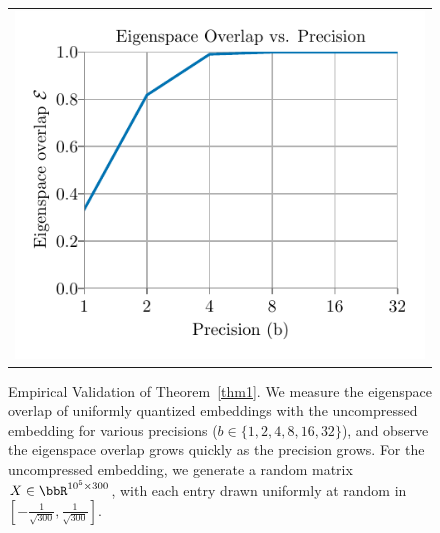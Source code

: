 
\begin{figure}
	\begin{tabular}{c}
		\includegraphics[width=\linewidth]{figures/micro_eig_overlap_vs_precision.pdf} 
\end{tabular}
\caption{Empirical Validation of Theorem~\ref{thm1}. We measure the eigenspace overlap of uniformly quantized embeddings with the uncompressed embedding for various precisions ($b\in\{1,2,4,8,16,32\}$), and observe the eigenspace overlap grows quickly as the precision grows.  For the uncompressed embedding, we generate a random matrix $X \in \RR^{10^5 \times 300}$, with each entry drawn uniformly at random in $[-\frac{1}{\sqrt{300}}, \frac{1}{\sqrt{300}}]$.}
\label{fig:micro_eigoverlap_vs_prec}
\end{figure}

